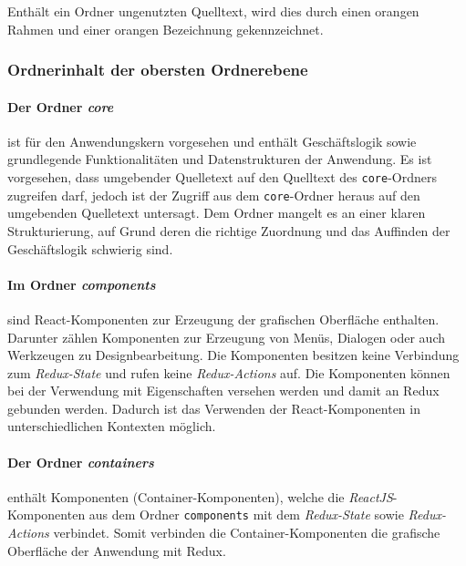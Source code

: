 Enthält ein Ordner ungenutzten Quelltext, wird dies durch einen orangen Rahmen und einer orangen Bezeichnung gekennzeichnet.

\subsubsection{Ordnerinhalt der obersten Ordnerebene}
\paragraph{Der Ordner \emph{core}} ist für den Anwendungskern vorgesehen und enthält Geschäftslogik sowie grundlegende Funktionalitäten und Datenstrukturen der Anwendung. 
Es ist vorgesehen, dass umgebender Quelletext auf den Quelltext des \lstinline|core|-Ordners zugreifen darf, jedoch ist der Zugriff aus dem \lstinline|core|-Ordner heraus auf den umgebenden Quelletext untersagt. Dem Ordner mangelt es an einer klaren Strukturierung, auf Grund deren die richtige Zuordnung und das Auffinden der Geschäftslogik schwierig sind. 

\paragraph{Im Ordner \emph{components}} sind React-Komponenten zur Erzeugung der grafischen Oberfläche enthalten. Darunter zählen Komponenten zur Erzeugung von Menüs, Dialogen oder auch Werkzeugen zu Designbearbeitung. Die Komponenten besitzen keine Verbindung zum \emph{Redux-State} und rufen keine \emph{Redux-Actions} auf. Die Komponenten können bei der Verwendung mit Eigenschaften versehen werden und damit an Redux gebunden werden. Dadurch ist das Verwenden der React-Komponenten in unterschiedlichen Kontexten möglich.

\paragraph{Der Ordner \emph{containers}} enthält Komponenten (Container-Komponenten), welche die \emph{ReactJS}-Komponenten aus dem Ordner \lstinline|components| mit dem \emph{Redux-State} sowie \emph{Redux-Actions} verbindet. Somit verbinden die Container-Komponenten die grafische Oberfläche der Anwendung mit Redux.



